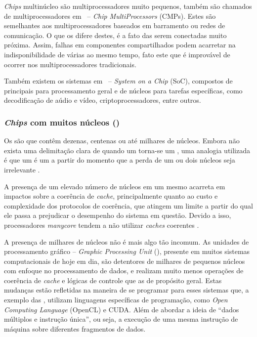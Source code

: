 \textit{Chips} multinúcleo são multiprocessadores muito pequenos, também são chamados de multiprocessadores em \chip~-- \textit{Chip MultiProcessors} (CMPs). Estes \chips são semelhantes aos multiprocessadores baseados em barramento ou redes de comunicação. O que os difere destes, é a fato das \cpus serem  conectadas muito próxima. Assim, falhas em componentes compartilhados podem acarretar na indisponibilidade de várias \cpus ao mesmo tempo, fato este que é improvável de ocorrer nos multiprocessadores tradicionais.

Também existem os sistemas em \chip~-- \textit{System on a Chip} (SoC), compostos de \cpus principais para processamento geral e de núcleos para tarefas específicas, como decodificação de aúdio e vídeo, criptoprocessadores, entre outros.

\subsubsection{\textit{Chips} com muitos núcleos (\manycore)}
\label{subsubsec:chips-manycore}

Os \manycore são \multicore que contêm dezenas, centenas ou até milhares de núcleos. Embora não exista uma delimitação clara de quando um \multicore torna-se um \manycore, uma analogia utilizada é que um \multicore é um \manycore a partir do momento que a perda de um ou dois núcleos seja irrelevante \cite{Tanenbaum:2014:MOS:2655363}.

A presença de um elevado número de núcleos em um mesmo \chip acarreta em impactos sobre a coerência de \textit{cache}, principalmente quanto ao custo e complexidade dos protocolos de coerência, que atingem um limite a partir do qual ele passa a prejudicar o desempenho do sistema em questão. Devido a isso, processadores \textit{manycore} tendem a não utilizar \textit{caches} coerentes \cite{Tanenbaum:2014:MOS:2655363}.

A presença de milhares de núcleos não é mais algo tão incomum. As unidades de processamento gráfico -- \textit{Graphic Processing Unit} (\gpu), presente em muitos sistemas computacionais de hoje em dia, são detentores de milhares de pequenos núcleos com enfoque no processamento de dados, e realizam muito menos operações de coerência de \textit{cache} e lógicas de controle que as \cpus de propósito geral. Estas mudanças estão refletidas na maneira de se programar para esses sistemas que, a exemplo das \gpus, utilizam linguagens específicas de programação, como \textit{Open Computing Language} (OpenCL) e CUDA. Além de abordar a ideia de ``dados múltiplos e instrução única'', ou seja, a execução de uma mesma instrução de máquina sobre diferentes fragmentos de dados. 

